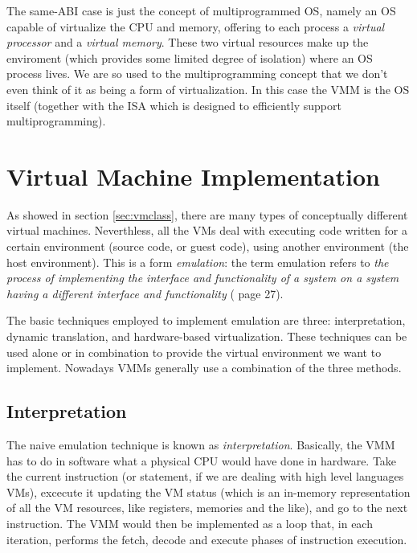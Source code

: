 \vspace{0.5cm}

The same-ABI case is just the concept of multiprogrammed OS, namely an OS capable of virtualize the CPU and
memory, offering to each process a \emph{virtual processor} and a \emph{virtual memory}. These two virtual resources make up
the enviroment (which provides some limited degree of isolation) where an OS process lives. We are so used to the multiprogramming
concept that we don't even think of it as being a form of virtualization. In this case the VMM is the OS itself (together with
the ISA which is designed to efficiently support multiprogramming).


\section{Virtual Machine Implementation}
\label{sec:vmimpl}

As showed in section \ref{sec:vmclass}, there are many types of conceptually different virtual machines.
Neverthless, all the VMs deal with executing code written for a certain environment (source code, or guest code),
using another environment (the host environment). This is a form \emph{emulation}: the term emulation refers to \emph{the process of
implementing the interface and functionality of a system on a system having a different interface and functionality}
(\cite{ref:vmbook} page 27).

The basic techniques employed to implement emulation are three: interpretation, dynamic translation, and hardware-based virtualization.
These techniques can be used alone or in combination to provide the virtual environment we want to implement.
Nowadays VMMs generally use a combination of the three methods.


\subsection{Interpretation}
\label{sec:interpretation}
The naive emulation technique is known as \emph{interpretation}.
Basically, the VMM has to do in software what a physical CPU would have done
in hardware. Take the current instruction (or statement, if we are dealing with high level languages VMs), excecute it updating the
VM status (which is an in-memory representation of all the VM resources, like registers, memories and the like), and go to the next
instruction. The VMM would then be implemented as a loop that, in each iteration, performs the fetch, decode and execute phases of
instruction execution.

